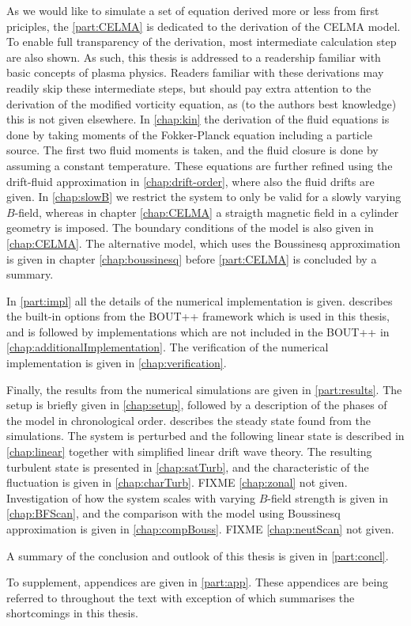 As we would like to simulate a set of equation derived more or less from first priciples, the \cref{part:CELMA} is dedicated to the derivation of the CELMA model.
To enable full transparency of the derivation, most intermediate calculation step are also shown.
As such, this thesis is addressed to a readership familiar with basic concepts of plasma physics.
Readers familiar with these derivations may readily skip these intermediate steps, but should pay extra attention to the derivation of the modified vorticity equation, as (to the authors best knowledge) this is not given elsewhere.
In \cref{chap:kin} the derivation of the fluid equations is done by taking moments of the Fokker-Planck equation including a particle source.
The first two fluid moments is taken, and the fluid closure is done by assuming a constant temperature.
These equations are further refined using the drift-fluid approximation in \cref{chap:drift-order}, where also the fluid drifts are given.
In \cref{chap:slowB} we restrict the system to only be valid for a slowly varying $B$-field, whereas in chapter \cref{chap:CELMA} a straigth magnetic field in a cylinder geometry is imposed.
The boundary conditions of the model is also given in \cref{chap:CELMA}.
The alternative model, which uses the Boussinesq approximation is given in chapter \cref{chap:boussinesq} before \cref{part:CELMA} is concluded by a summary.

In \cref{part:impl} all the details of the numerical implementation is given.
 describes the built-in options from the BOUT++ framework which is used in this thesis, and is followed by implementations which are not included in the BOUT++ in \cref{chap:additionalImplementation}.
The verification of the numerical implementation is given in \cref{chap:verification}.

Finally, the results from the numerical simulations are given in \cref{part:results}.
The setup is briefly given in \cref{chap:setup}, followed by a description of the phases of the model in chronological order.
 describes the steady state found from the simulations.
The system is perturbed and the following linear state is described in \cref{chap:linear} together with simplified linear drift wave theory.
The resulting turbulent state is presented in \cref{chap:satTurb}, and the characteristic of the fluctuation is given in \cref{chap:charTurb}.
FIXME \cref{chap:zonal} not given.
Investigation of how the system scales with varying $B$-field strength is given in \cref{chap:BFScan}, and the comparison with the model using Boussinesq approximation is given in \cref{chap:compBouss}.
FIXME \cref{chap:neutScan} not given.

A summary of the conclusion and outlook of this thesis is given in \cref{part:concl}.

To supplement, appendices are given in \cref{part:app}. These appendices are being referred to throughout the text with exception of \label{app:shortcomings} which summarises the shortcomings in this thesis.

